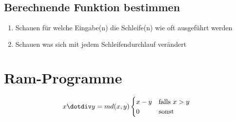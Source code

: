 \documentclass[14pt]{article}
\begin{document}
\subsection{Berechnende Funktion bestimmen}
\begin{enumerate}
    \item Schauen für welche Eingabe(n) die Schleife(n) wie oft
          ausgeführt werden
    \item Schauen was sich mit jedem Schleifendurchlauf verändert
\end{enumerate}


\section{Ram-Programme}
\begin{definition}
    \begin{equation*}
        x \dotdiv y =  md(x, y)
        \begin{cases}
            x - y & \text{falls $x > y$} \\
            0     & \text{sonst}
        \end{cases}
    \end{equation*}
\end{definition}
\end{document}
